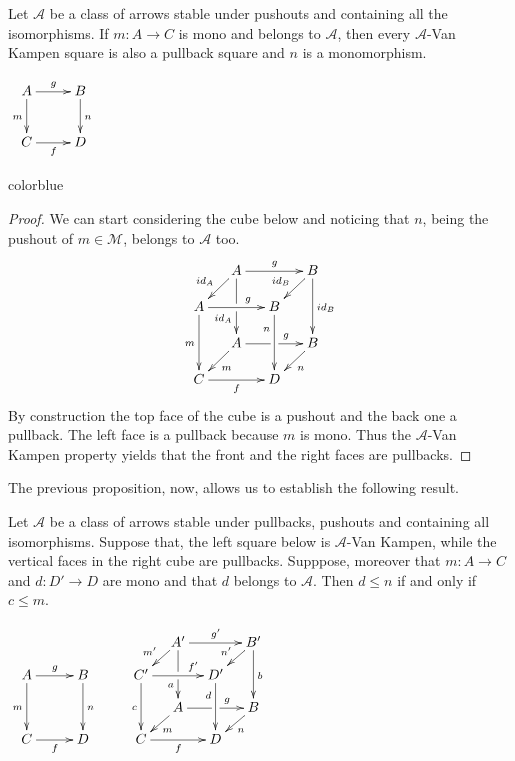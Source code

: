 \documentclass[a4paper,UKenglish,cleveref,pdftex,thm-restate,numberwithinsect,anonymous]{lipics}
\newcommand{\full}[1]{{color{blue}#1}}
\newcommand{\full}[1]{}
\newcommand{\id}[1]{\mathsf{id}_{#1}}
\def\C{\textbf {\textup{C}}}
\begin{document}
\noindent 
\parbox{11.5cm}{\begin{proposition}\label{prop:pbpo} Let $\mathcal{A}$ be a class of arrows stable under pushouts and containing all the isomorphisms.  If $m\colon A\to C$ is mono and belongs to $\mathcal{A}$, then every $\mathcal{A}$-Van Kampen square
	is also a pullback square and $n$ is a monomorphism.
\end{proposition}}
\parbox{2cm}{\vspace{1.5ex}$\xymatrix{A\ar[r]^{g} \ar[d]_{m} & B \ar[d]^{n} \\ C \ar[r]_{f}  & D}$}

\full{ 
\begin{proof}
	We can start considering the cube below and noticing that $n$, being the pushout of $m\in \mathcal{M}$, belongs to $\mathcal{A}$ too.
	\[\xymatrix@C=13pt@R=13pt{&A\ar[dd]|\hole_(.65){\id{A}}\ar[rr]^{g} \ar[dl]_{\id{A}} && B \ar[dd]^{\id{B}} \ar[dl]_{\id{B}} \\ A  \ar[dd]_{m}\ar[rr]^(.65){g} & & B \ar[dd]_(.3){n}\\&A\ar[rr]|\hole^(.65){g} \ar[dl]^{m} && B \ar[dl]^{n} \\C \ar[rr]_{f} & & D}\]
	By construction the top face of the cube is a pushout and the back one a pullback. The left face is a pullback because $m$ is mono. Thus the $\mathcal{A}$-Van Kampen property yields that the front and the right faces are pullbacks.
\end{proof}}

The previous proposition, now, allows us to establish the following result.

\noindent \parbox{7.4cm}{
\begin{lemma}\label{lem:varie}Let $\mathcal{A}$ be a class of arrows stable under pullbacks, pushouts and containing all isomorphisms.  Suppose that, the left square below is $\mathcal{A}$-Van Kampen, while the vertical faces in the right cube are pullbacks. 	Supppose, moreover that $m\colon A\to C$ and $d\colon D'\to D$ are mono and that $d$ belongs to $\mathcal{A}$. Then $d\leq n$ if and only if $c \leq m$.
\end{lemma}}
	\parbox{6cm}{$\xymatrix@C=10pt@R=10pt{&&&&&A'\ar[dd]|\hole_(.65){a}\ar[rr]^{g'} \ar[dl]_{m'} && B' \ar[dd]^{b} \ar[dl]_{n'} \\ A \ar[dd]_{m}\ar[rr]^{g}&&B\ar[dd]^{n}&&C'  \ar[dd]_{c}\ar[rr]^(.7){f'} & & D' \ar[dd]_(.3){d}\\&&&&&A\ar[rr]|\hole^(.65){g} \ar[dl]^{m} && B \ar[dl]^{n} \\C\ar[rr]_{f} &&D&&C \ar[rr]_{f} & & D}$}
\end{document}
